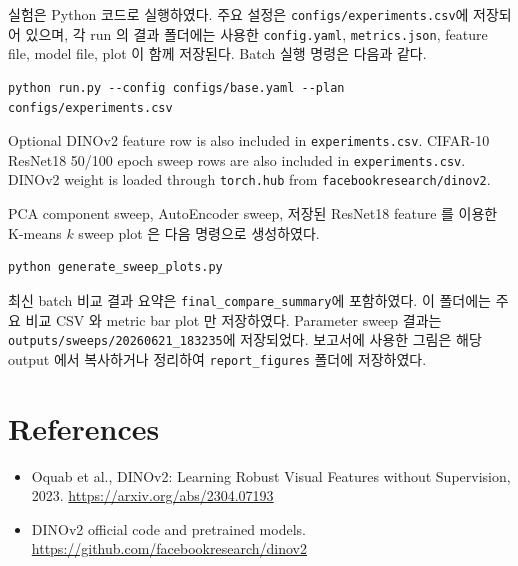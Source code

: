 \documentclass[11pt]{article}
\begin{document}
실험은 Python 코드로 실행하였다.
주요 설정은 \texttt{configs/experiments.csv}에 저장되어 있으며, 각 run 의 결과 폴더에는 사용한 \texttt{config.yaml}, \texttt{metrics.json}, feature file, model file, plot 이 함께 저장된다.
Batch 실행 명령은 다음과 같다.

\begin{lstlisting}
python run.py --config configs/base.yaml --plan configs/experiments.csv
\end{lstlisting}

Optional DINOv2 feature row is also included in \texttt{experiments.csv}.
CIFAR-10 ResNet18 50/100 epoch sweep rows are also included in \texttt{experiments.csv}.
DINOv2 weight is loaded through \texttt{torch.hub} from \texttt{facebookresearch/dinov2}.

PCA component sweep, AutoEncoder sweep, 저장된 ResNet18 feature 를 이용한 K-means \(k\) sweep plot 은 다음 명령으로 생성하였다.

\begin{lstlisting}
python generate_sweep_plots.py
\end{lstlisting}

최신 batch 비교 결과 요약은 \texttt{final\_compare\_summary}에 포함하였다.
이 폴더에는 주요 비교 CSV 와 metric bar plot 만 저장하였다.
Parameter sweep 결과는 \texttt{outputs/sweeps/20260621\_183235}에 저장되었다.
보고서에 사용한 그림은 해당 output 에서 복사하거나 정리하여 \texttt{report\_figures} 폴더에 저장하였다.

\section{References}

\begin{itemize}[leftmargin=*]
    \item Oquab et al., DINOv2: Learning Robust Visual Features without Supervision, 2023. \url{https://arxiv.org/abs/2304.07193}
    \item DINOv2 official code and pretrained models. \url{https://github.com/facebookresearch/dinov2}
\end{itemize}
\end{document}
